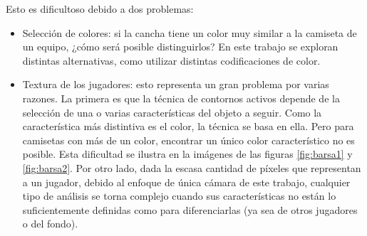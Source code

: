 Esto es dificultoso debido a dos problemas:
\begin{itemize}

\item Selección de colores: si la cancha tiene un color muy similar a la
  camiseta de un equipo, ¿cómo será posible distinguirlos? En este trabajo se
  exploran distintas alternativas, como utilizar distintas codificaciones de
  color.

\item Textura de los jugadores: esto representa un gran problema por varias
  razones. La primera es que la técnica de contornos activos depende de la
  selección de una o varias características del objeto a seguir. Como la
  característica más distintiva es el color, la técnica se basa en ella. Pero
  para camisetas con más de un color, encontrar un único color característico
  no es posible. Esta dificultad se ilustra en la imágenes de las figuras
  \ref{fig:barsa1} y \ref{fig:barsa2}. Por otro lado, dada la escasa cantidad
  de píxeles que representan a un jugador, debido al enfoque de única
  cámara de este trabajo, cualquier tipo de análisis se torna complejo cuando
  sus características no están lo suficientemente definidas como para
  diferenciarlas (ya sea de otros jugadores o del fondo).

\end{itemize}

